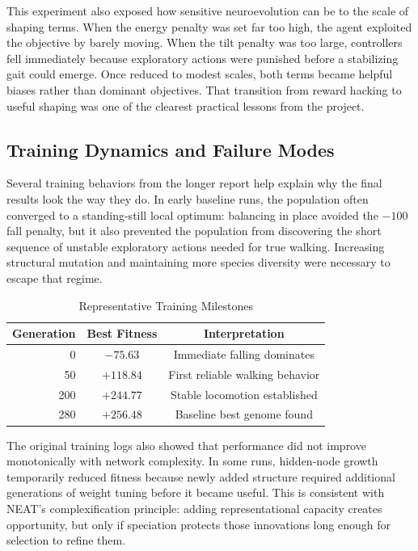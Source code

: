\documentclass[journal]{IEEEtran}
\begin{document}
This experiment also exposed how sensitive neuroevolution can be to the scale of shaping terms. When the energy penalty was set far too high, the agent exploited the objective by barely moving. When the tilt penalty was too large, controllers fell immediately because exploratory actions were punished before a stabilizing gait could emerge. Once reduced to modest scales, both terms became helpful biases rather than dominant objectives. That transition from reward hacking to useful shaping was one of the clearest practical lessons from the project.

\subsection{Training Dynamics and Failure Modes}
Several training behaviors from the longer report help explain why the final results look the way they do. In early baseline runs, the population often converged to a standing-still local optimum: balancing in place avoided the $-100$ fall penalty, but it also prevented the population from discovering the short sequence of unstable exploratory actions needed for true walking. Increasing structural mutation and maintaining more species diversity were necessary to escape that regime.

\begin{table}[t]
\caption{Representative Training Milestones}
\label{tab:milestones}
\centering
\begin{tabular}{rcc}
\toprule
\textbf{Generation} & \textbf{Best Fitness} & \textbf{Interpretation} \\
\midrule
0 & $-75.63$ & Immediate falling dominates \\
50 & $+118.84$ & First reliable walking behavior \\
200 & $+244.77$ & Stable locomotion established \\
280 & $+256.48$ & Baseline best genome found \\
\bottomrule
\end{tabular}
\end{table}

The original training logs also showed that performance did not improve monotonically with network complexity. In some runs, hidden-node growth temporarily reduced fitness because newly added structure required additional generations of weight tuning before it became useful. This is consistent with NEAT's complexification principle: adding representational capacity creates opportunity, but only if speciation protects those innovations long enough for selection to refine them.
\end{document}
